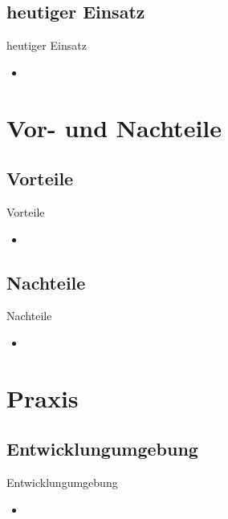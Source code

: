\documentclass{beamer}
\begin{document}
\subsection{heutiger Einsatz}

\begin{frame}{heutiger Einsatz}
	\begin{itemize}
		\item
	\end{itemize}
\end{frame}

\section{Vor- und Nachteile}

\subsection{Vorteile}

\begin{frame}{Vorteile}
	\begin{itemize}
		\item
	\end{itemize}
\end{frame}

\subsection{Nachteile}

\begin{frame}{Nachteile}
	\begin{itemize}
		\item
	\end{itemize}
\end{frame}

\section{Praxis}

\subsection{Entwicklungumgebung}

\begin{frame}{Entwicklungumgebung}
	\begin{itemize}
		\item
	\end{itemize}
\end{frame}
\end{document}
